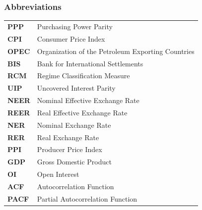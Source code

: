 \begin{frame}
    \frametitle{Abbreviations}
    \vfill
    \centering\tiny
    \begin{tabular}{@{}l l@{}}
        \textbf{PPP} & Purchasing Power Parity \\
        \textbf{CPI} & Consumer Price Index \\
        \textbf{OPEC} & Organization of the Petroleum Exporting Countries \\
        \textbf{BIS} & Bank for International Settlements \\
        \textbf{RCM} & Regime Classification Measure \\
        \textbf{UIP} & Uncovered Interest Parity \\
        \textbf{NEER} & Nominal Effective Exchange Rate \\
        \textbf{REER} & Real Effective Exchange Rate \\
        \textbf{NER} & Nominal Exchange Rate \\
        \textbf{RER} & Real Exchange Rate \\
        \textbf{PPI} & Producer Price Index \\
        \textbf{GDP} & Gross Domestic Product \\
        \textbf{OI} & Open Interest \\
        \textbf{ACF} & Autocorrelation Function \\
        \textbf{PACF} & Partial Autocorrelation Function
    \end{tabular}
    \vfill
\end{frame}